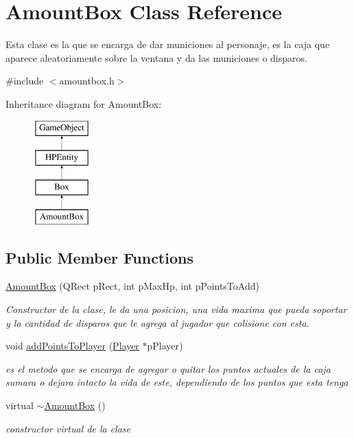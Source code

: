 \hypertarget{class_amount_box}{\section{Amount\-Box Class Reference}
\label{class_amount_box}
}


Esta clase es la que se encarga de dar municiones al personaje, es la caja que aparece aleatoriamente sobre la ventana y da las municiones o disparos.  




{\ttfamily \#include $<$amountbox.\-h$>$}

Inheritance diagram for Amount\-Box\-:\begin{figure}[H]
\begin{center}
\leavevmode
\includegraphics[height=4.000000cm]{class_amount_box}
\end{center}
\end{figure}
\subsection*{Public Member Functions}
\begin{DoxyCompactItemize}
\item 
\hyperlink{class_amount_box_a19f89bb62420a75212487fd191f256c4}{Amount\-Box} (Q\-Rect p\-Rect, int p\-Max\-Hp, int p\-Points\-To\-Add)
\begin{DoxyCompactList}\small\item\em Constructor de la clase, le da una posicion, una vida maxima que pueda soportar y la cantidad de disparos que le agrega al jugador que colisione con esta. \end{DoxyCompactList}\item 
void \hyperlink{class_amount_box_a006ae7739b2e6dbbb19c0a2a09936a71}{add\-Points\-To\-Player} (\hyperlink{class_player}{Player} $\ast$p\-Player)
\begin{DoxyCompactList}\small\item\em es el metodo que se encarga de agregar o quitar los puntos actuales de la caja sumara o dejara intacto la vida de este, dependiendo de los puntos que esta tenga \end{DoxyCompactList}\item 
virtual \hyperlink{class_amount_box_a4d6ec95818bed923b6c19e1df6b50db8}{$\sim$\-Amount\-Box} ()
\begin{DoxyCompactList}\small\item\em constructor virtual de la clase \end{DoxyCompactList}\end{DoxyCompactItemize}
